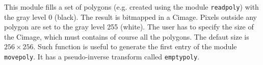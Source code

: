 This module fills a set of polygons (e.g. created using the
module \verb+readpoly+) with the gray level 0 (black).
The result is bitmapped in a Cimage.
Pixels outside any polygon are set to the gray level 255 (white).
The user has to specify the size of the Cimage, which must contains of course
all the polygons. The defaut size is $256 \times 256$.
Such function is useful to generate the first entry of the 
module \verb+movepoly+.
It has a pseudo-inverse transform called \verb+emptypoly+.

